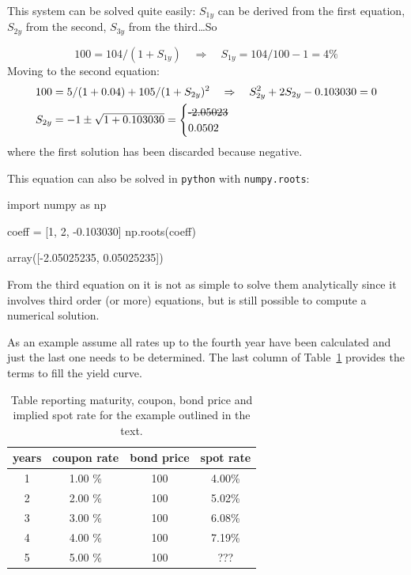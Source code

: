 This system can be solved quite easily: $S_{1y}$ can be derived from the first equation, $S_{2y}$ from the second, $S_{3y}$ from the third\ldots So

\begin{equation}
100 = 104 / (1 + S_{1y})\quad\Rightarrow\quad S_{1y} = 104/100 - 1 = 4\%
\end{equation}
Moving to the second equation:
\begin{equation}
\begin{split}
& 100 = 5 / (1 + 0.04) + 105 / (1 + S_{2y})^{2}\quad\Rightarrow\quad S_{2y}^2  + 2 S_{2y}  - 0.103030 = 0 \\
& S_{2y} = - 1 \pm \sqrt{1 + 0.103030} = \begin{cases}\text{\sout{-2.05023}} \\ 0.0502\end{cases}
\end{split}
\end{equation}
where the first solution has been discarded because negative.

This equation can also be solved in \texttt{python} with \texttt{numpy.roots}:
\begin{ipython}
import numpy as np

coeff = [1, 2, -0.103030]
np.roots(coeff)
\end{ipython}
\begin{ioutput}
array([-2.05025235,  0.05025235])
\end{ioutput}

From the third equation on it is not as simple to solve them analytically since it involves third order (or more) equations, but is still possible to compute a numerical solution.

As an example assume all rates up to the fourth year have been calculated and just the last one needs to be determined. The last column of Table~\ref{tab:rates} provides the terms to fill the yield curve.

\begin{table}[htb]
\begin{center}
\begin{tabular}{|c|c|c|c|}
\hline
\textbf{years} & \textbf{coupon rate} & \textbf{bond price} & \textbf{spot rate} \\
\hline
1 & 1.00 \% & 100 & 4.00\% \\
\hline
2 & 2.00 \% & 100 & 5.02\% \\
\hline
3 & 3.00 \% & 100 & 6.08\% \\
\hline
4 & 4.00 \% & 100 & 7.19\% \\
\hline
5 & 5.00 \% & 100 & ??? \\
\hline
\end{tabular}
\end{center}
\caption{Table reporting maturity, coupon, bond price and implied spot rate for the example outlined in the text.}
\label{tab:rates}
\end{table}

